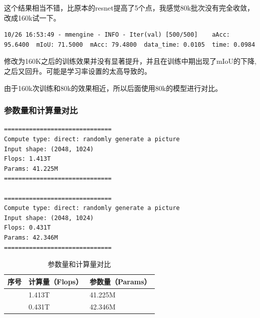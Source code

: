 \documentclass[12pt]{ctexart}
\begin{document}
这个结果相当不错，比原本的resnet提高了5个点，我感觉80k批次没有完全收敛，改成160k试一下。
\begin{lstlisting}
10/26 16:53:49 - mmengine - INFO - Iter(val) [500/500]    aAcc: 95.6400  mIoU: 71.5000  mAcc: 79.4800  data_time: 0.0105  time: 0.0984
\end{lstlisting}
修改为160K之后的训练效果并没有显著提升，并且在训练中期出现了mIoU的下降,之后又回升。可能是学习率设置的太高导致的。

由于160k次训练和80k的效果相近，所以后面使用80k的模型进行对比。

\subsubsection{参数量和计算量对比}
\begin{lstlisting}
==============================
Compute type: direct: randomly generate a picture
Input shape: (2048, 1024)
Flops: 1.413T
Params: 41.225M
==============================

==============================
Compute type: direct: randomly generate a picture
Input shape: (2048, 1024)
Flops: 0.431T
Params: 42.346M
==============================
\end{lstlisting}

\begin{table}[htbp]
  \caption{参数量和计算量对比}
  \renewcommand\arraystretch{1.4}
  \begin{tabularx}{\textwidth}{>{\centering\arraybackslash}p{1.5cm} X X}
  \toprule
  \textbf{序号} & \textbf{计算量（Flops）} & \textbf{参数量（Params）} \\
  \midrule
    1 & 1.413T & 41.225M \\
    2 & 0.431T & 42.346M \\
  \bottomrule
  \end{tabularx}
\end{table}
\end{document}
